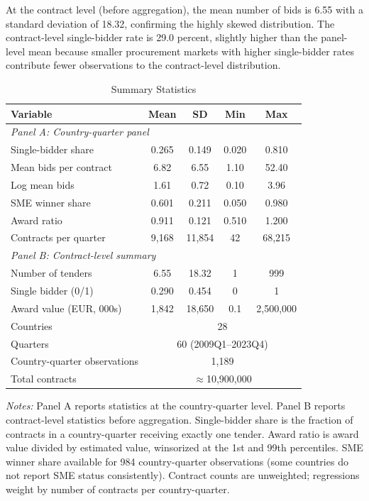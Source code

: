 \documentclass[12pt]{article}
\begin{document}
At the contract level (before aggregation), the mean number of bids is 6.55 with a standard deviation of 18.32, confirming the highly skewed distribution. The contract-level single-bidder rate is 29.0 percent, slightly higher than the panel-level mean because smaller procurement markets with higher single-bidder rates contribute fewer observations to the contract-level distribution.

\begin{table}[H]
\centering
\caption{Summary Statistics}
\begin{threeparttable}
\begin{tabular}{lcccc}
\toprule
Variable & Mean & SD & Min & Max \\
\midrule
\multicolumn{5}{l}{\textit{Panel A: Country-quarter panel}} \\[3pt]
Single-bidder share & 0.265 & 0.149 & 0.020 & 0.810 \\
Mean bids per contract & 6.82 & 6.55 & 1.10 & 52.40 \\
Log mean bids & 1.61 & 0.72 & 0.10 & 3.96 \\
SME winner share & 0.601 & 0.211 & 0.050 & 0.980 \\
Award ratio & 0.911 & 0.121 & 0.510 & 1.200 \\
Contracts per quarter & 9,168 & 11,854 & 42 & 68,215 \\[6pt]
\multicolumn{5}{l}{\textit{Panel B: Contract-level summary}} \\[3pt]
Number of tenders & 6.55 & 18.32 & 1 & 999 \\
Single bidder (0/1) & 0.290 & 0.454 & 0 & 1 \\
Award value (EUR, 000s) & 1,842 & 18,650 & 0.1 & 2,500,000 \\[3pt]
\midrule
Countries & \multicolumn{4}{c}{28} \\
Quarters & \multicolumn{4}{c}{60 (2009Q1--2023Q4)} \\
Country-quarter observations & \multicolumn{4}{c}{1,189} \\
Total contracts & \multicolumn{4}{c}{$\approx$10,900,000} \\
\bottomrule
\end{tabular}
\begin{tablenotes}[flushleft]
\small
\item \textit{Notes:} Panel A reports statistics at the country-quarter level. Panel B reports contract-level statistics before aggregation. Single-bidder share is the fraction of contracts in a country-quarter receiving exactly one tender. Award ratio is award value divided by estimated value, winsorized at the 1st and 99th percentiles. SME winner share available for 984 country-quarter observations (some countries do not report SME status consistently). Contract counts are unweighted; regressions weight by number of contracts per country-quarter.
\end{tablenotes}
\end{threeparttable}
\label{tab:summary}
\end{table}
\end{document}

